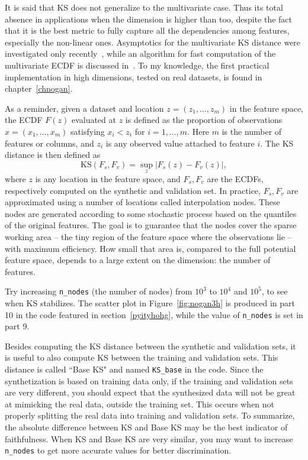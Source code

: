 \documentclass[oneside,10pt]{book}
\begin{document}
It is said that KS does not generalize to the multivariate case. Thus its 
 total absence in applications when the dimension is higher than too, despite the fact that it is the best metric to fully capture all 
the dependencies among features, especially the non-linear ones. 
 Asymptotics for the multivariate KS distance were investigated only recently~\cite{gtepouc21}, while an algorithm 
 for fast computation of the multivariate ECDF is discussed in~\cite{putrider22}. To my knowledge,
 the first practical implementation in high dimensions, tested on real datasets, is found in chapter~\ref{chnogan}. 


As a reminder, given a dataset and location $z = (z_1,\dots, z_m)$ in the feature space, the ECDF $F(z)$ evaluated at $z$ is defined as
 the proportion of observations $x = (x_1,\dots,x_m)$ 
 satisfying $x_i < z_i$ for $i=1,\dots,m$. Here $m$ is the number of features or columns, and $z_i$ is any observed value attached to
 feature $i$. The KS distance is then defined as
$$
\text{KS}(F_s, F_v) = \sup_{z} |F_s(z) - F_v(z)|,
$$
where $z$ is any location in the feature space, and $F_s, F_v$ are the ECDFs, respectively computed on the synthetic and validation set. 
In practice, $F_s,F_v$ are approximated using a number of locations called \textcolor{index}{interpolation nodes}.
 These nodes are generated according to some stochastic process based on the quantiles of the original features. The goal is to guarantee
 that the nodes cover the sparse working area -- the tiny region of the feature space where the observations lie  -- with maximum efficiency.
 How small that area is, compared to the full potential feature space, depends to a large extent on the dimension: the number of features.



Try increasing \texttt{n\_nodes} (the number of nodes) from $10^3$ to $10^4$ and $10^5$, to see when KS stabilizes.  The scatter plot 
 in Figure~\ref{fig:nogan3h} is produced
 in part 10 in the code featured in section~\ref{pyityhohg}, while the value of \texttt{n\_nodes} is set in part 9.

Besides computing the KS distance between the synthetic and validation sets, it is useful to also compute KS between the training and validation sets. This distance is called ``Base KS" and named \texttt{KS\_base} in the code. Since the synthetization is based on training data only, if the training and validation sets are very different, you should expect that the synthesized data will not be great at mimicking the real data, outside the training set. 
 This occurs when not properly splitting the real data into training and validation sets. To summarize, the absolute difference between
 KS and Base KS may be the best indicator of faithfulness. When KS and Base KS are very similar, you may want to increase \texttt{n\_nodes} to
 get more accurate values for better discrimination.
\end{document}
